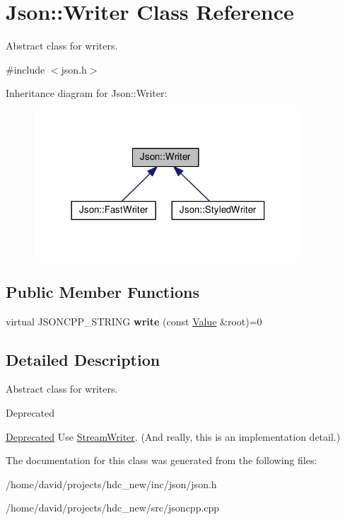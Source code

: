 \hypertarget{class_json_1_1_writer}{}\section{Json\+:\+:Writer Class Reference}
\label{class_json_1_1_writer}


Abstract class for writers.  




{\ttfamily \#include $<$json.\+h$>$}



Inheritance diagram for Json\+:\+:Writer\+:
\nopagebreak
\begin{figure}[H]
\begin{center}
\leavevmode
\includegraphics[width=285pt]{class_json_1_1_writer__inherit__graph}
\end{center}
\end{figure}
\subsection*{Public Member Functions}
\begin{DoxyCompactItemize}
\item 
virtual J\+S\+O\+N\+C\+P\+P\+\_\+\+S\+T\+R\+I\+NG {\bfseries write} (const \hyperlink{class_json_1_1_value}{Value} \&root)=0\hypertarget{class_json_1_1_writer_a61c55882b82c7651d0b9b683c6d3f371}{}\label{class_json_1_1_writer_a61c55882b82c7651d0b9b683c6d3f371}

\end{DoxyCompactItemize}


\subsection{Detailed Description}
Abstract class for writers. 

\begin{DoxyRefDesc}{Deprecated}
\item[\hyperlink{deprecated__deprecated000007}{Deprecated}]Use \hyperlink{class_json_1_1_stream_writer}{Stream\+Writer}. (And really, this is an implementation detail.) \end{DoxyRefDesc}


The documentation for this class was generated from the following files\+:\begin{DoxyCompactItemize}
\item 
/home/david/projects/hdc\+\_\+new/inc/json/json.\+h\item 
/home/david/projects/hdc\+\_\+new/src/jsoncpp.\+cpp\end{DoxyCompactItemize}
